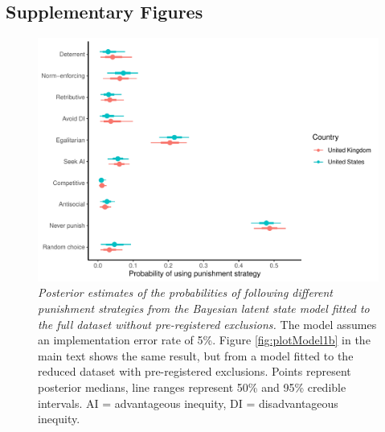 \documentclass[
  english,
  man, donotrepeattitle,floatsintext]{apa6}
\begin{document}
\par

\normalsize
\newpage

\hypertarget{supplementary-figures}{%
\subsection{Supplementary Figures}\label{supplementary-figures}}










\begin{figure}
\centering
\includegraphics{manuscript_files/figure-latex/plotModel1a-1.pdf}
\caption{\label{fig:plotModel1a}\emph{Posterior estimates of the probabilities of following
different punishment strategies from the Bayesian latent state model fitted to
the full dataset without pre-registered exclusions.} The model assumes an
implementation error rate of 5\%. Figure \ref{fig:plotModel1b} in the main text
shows the same result, but from a model fitted to the reduced dataset with
pre-registered exclusions. Points represent posterior medians, line ranges
represent 50\% and 95\% credible intervals. AI = advantageous inequity, DI =
disadvantageous inequity.}
\end{figure}

\newpage
\end{document}
